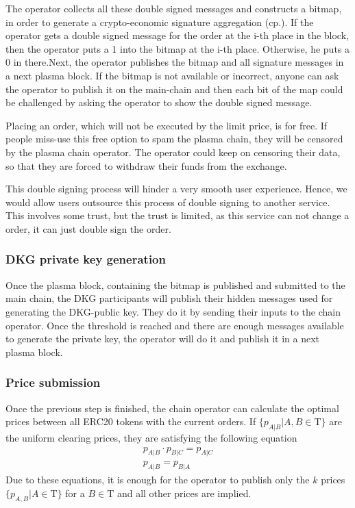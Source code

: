 \documentclass[11pt,parskip=full]{scrartcl}%
\newcommand{\Tau}{\mathrm{T}}
\begin{document}
The operator collects all these double signed messages and constructs a bitmap, in order to generate a crypto-economic signature aggregation (cp.\cite{sig}). 
If the operator gets a double signed message for the order at the i-th place in the block, then the operator puts a 1 into the bitmap at the i-th place. 
Otherwise, he puts a 0 in there.Next, the operator publishes the bitmap and all signature messages in a next plasma block. 
If the bitmap is not available or incorrect, anyone can ask the operator to publish it on the main-chain and then each bit of the map could be challenged by asking the operator to show the double signed message. 

Placing an order, which will not be executed by the limit price, is for free. 
If people miss-use this free option to spam the plasma chain, they will be censored by the plasma chain operator. 
The operator could keep on censoring their data, so that they are forced to withdraw their funds from the exchange. 

This double signing process will hinder a very smooth user experience. 
Hence, we would allow users outsource this process of double signing to another service. 
This involves some trust, but the trust is limited, as this service can not change a order, it can just double sign the order. 

\subsubsection{DKG private key generation}
Once the plasma block, containing the bitmap is published and submitted to the main chain, the DKG participants will publish their hidden messages used for generating the DKG-public key. 
They do it by sending their inputs to the chain operator.
Once the threshold is reached and there are enough messages available to generate the private key, the operator will do it and publish it in a next plasma block. 

\subsubsection{Price submission}
Once the previous step is finished, the chain operator can calculate the optimal prices between all ERC20 tokens with the current orders. 
If $\{p_{A|B}| A,B \in \Tau \}$  are the uniform clearing prices, they are satisfying the following equation
\begin{align}
    \label{eq:arbitrage_freeness}
  p_{A|B} \cdot p_{B|C} = p_{A|C}\\
  p_{A|B} = p_{B|A}
\end{align}
Due to these equations, it is enough for the operator to publish only the $k$ prices $\{p_{A,B}| A \in \Tau \}$ for a $B\in \Tau$ and all other prices are implied. 
\end{document}
